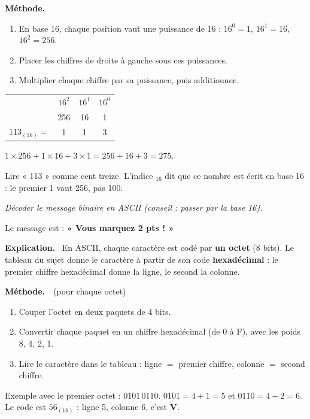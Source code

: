 \documentclass[addpoints, 11pt]{exam}
\newcommand{\enonce}[1]{\textit{#1}\par\smallskip}
\newcommand{\methode}{\par\smallskip\noindent\textbf{Méthode.}\ }
\newcommand{\explication}{\par\smallskip\noindent\textbf{Explication.}\ }
\DeclareRobustCommand{\_}{\textunderscore\allowbreak}
\begin{document}
\begin{questions}
\methode
\begin{enumerate}
  \item En base 16, chaque position vaut une puissance de 16 : $16^0 = 1$, $16^1 = 16$, $16^2 = 256$.
  \item Placer les chiffres de droite à gauche sous ces puissances.
  \item Multiplier chaque chiffre par sa puissance, puis additionner.
\end{enumerate}
\begin{center}
\begin{tabular}{l|ccc}
 & $16^2$ & $16^1$ & $16^0$\\
 & 256 & 16 & 1\\ \hline
$113_{(16)} =$ & 1 & 1 & 3\\
\end{tabular}
\end{center}
$1 \times 256 + 1 \times 16 + 3 \times 1 = 256 + 16 + 3 = 275$.

\begin{erreur}
Lire « 113 » comme cent treize. L'indice $_{16}$ dit que ce nombre est écrit en base 16 : le premier 1 vaut 256, pas 100.
\end{erreur}

\question[2] \enonce{Décoder le message binaire en ASCII (conseil : passer par la base 16).}

\begin{reponse}
Le message est : \textbf{« Vous marquez 2 pts ! »}
\end{reponse}

\explication
En ASCII, chaque caractère est codé par \textbf{un octet} (8 bits). Le tableau du sujet donne le caractère à partir de son code \textbf{hexadécimal} : le premier chiffre hexadécimal donne la ligne, le second la colonne.

\methode\ (pour chaque octet)
\begin{enumerate}
  \item Couper l'octet en deux paquets de 4 bits.
  \item Convertir chaque paquet en un chiffre hexadécimal (de 0 à F), avec les poids 8, 4, 2, 1.
  \item Lire le caractère dans le tableau : ligne $=$ premier chiffre, colonne $=$ second chiffre.
\end{enumerate}
Exemple avec le premier octet : $0101\,0110$. $0101 = 4 + 1 = 5$ et $0110 = 4 + 2 = 6$. Le code est $56_{(16)}$ : ligne 5, colonne 6, c'est \textbf{V}.


\end{questions}
\end{document}
